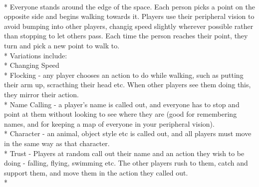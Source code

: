 \begin{minipage}{\textwidth}
\\*
Everyone stands around the edge of the space.  Each person picks a point on the opposite side and begins walking towards it.  Players use their peripheral vision to avoid bumping into other players, changig speed slightly wherever possible rather than stopping to let others pass.  Each time the person reaches their point, they turn and pick a new point to walk to.\\*
Variations include:\\*
Changing Speed\\*
Flocking - any player chooses an action to do while walking, such as putting their arm up, scracthing their head etc.  When other players see them doing this, they mirror their action.\\*
Name Calling - a player's name is called out, and everyone has to stop and point at them without looking to see where they are (good for remembering names, and for keeping a map of everyone in your peripheral vision).\\*
Character - an animal, object style etc is called out, and all players must move in the same way as that character.\\*
Trust - Players at random call out their name and an action they wish to be doing - falling, flying, swimming etc.  The other players rush to them, catch and support them, and move them in the action they called out.\\*
\end{minipage}    \vfill

